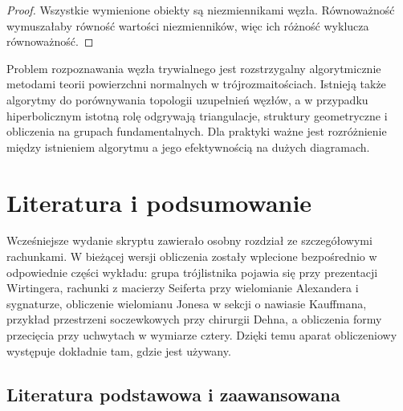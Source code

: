 \begin{proof}
Wszystkie wymienione obiekty są niezmiennikami węzła.
Równoważność wymuszałaby równość wartości niezmienników,
więc ich różność wyklucza równoważność.
\end{proof}

\begin{uwaga}
Problem rozpoznawania węzła trywialnego jest rozstrzygalny
algorytmicznie metodami teorii powierzchni normalnych
w trójrozmaitościach. Istnieją także algorytmy do porównywania
topologii uzupełnień węzłów, a w przypadku hiperbolicznym
istotną rolę odgrywają triangulacje, struktury geometryczne
i obliczenia na grupach fundamentalnych.
Dla praktyki ważne jest rozróżnienie między istnieniem
algorytmu a jego efektywnością na dużych diagramach.
\end{uwaga}



\chapter{Literatura i podsumowanie}
\label{ch:kt-literatura-podsumowanie}

Wcześniejsze wydanie skryptu zawierało osobny rozdział ze szczegółowymi rachunkami. W bieżącej wersji obliczenia zostały wplecione bezpośrednio w odpowiednie części wykładu: grupa trójlistnika pojawia się przy prezentacji Wirtingera, rachunki z macierzy Seiferta przy wielomianie Alexandera i sygnaturze, obliczenie wielomianu Jonesa w sekcji o nawiasie Kauffmana, przykład przestrzeni soczewkowych przy chirurgii Dehna, a obliczenia formy przecięcia przy uchwytach w wymiarze cztery. Dzięki temu aparat obliczeniowy występuje dokładnie tam, gdzie jest używany.

\section{Literatura podstawowa i zaawansowana}
\label{sec:kt-literatura}

